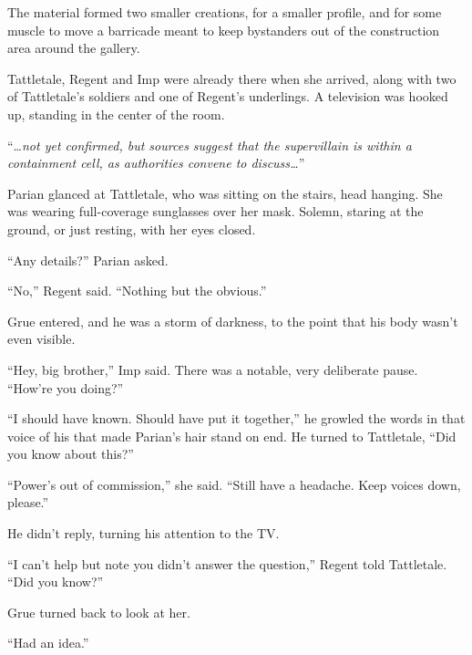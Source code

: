 The material formed two smaller creations, for a smaller profile, and for some muscle to move a barricade meant to keep bystanders out of the construction area around the gallery.



Tattletale, Regent and Imp were already there when she arrived, along with two of Tattletale's soldiers and one of Regent's underlings.  A television was hooked up, standing in the center of the room.



``\ldots\emph{not yet confirmed, but sources suggest that the supervillain is within a containment cell, as authorities convene to discuss\ldots}''



Parian glanced at Tattletale, who was sitting on the stairs, head hanging.  She was wearing full-coverage sunglasses over her mask.  Solemn, staring at the ground, or just resting, with her eyes closed.



``Any details?'' Parian asked.



``No,'' Regent said.  ``Nothing but the obvious.''



Grue entered, and he was a storm of darkness, to the point that his body wasn't even visible.



``Hey, big brother,'' Imp said.  There was a notable, very deliberate pause.  ``How're you doing?''



``I should have known.  Should have put it together,'' he growled the words in that voice of his that made Parian's hair stand on end.  He turned to Tattletale, ``Did you know about this?''



``Power's out of commission,'' she said.  ``Still have a headache.  Keep voices down, please.''



He didn't reply, turning his attention to the TV.



``I can't help but note you didn't answer the question,'' Regent told Tattletale.  ``Did you know?''



Grue turned back to look at her.



``Had an idea.''



